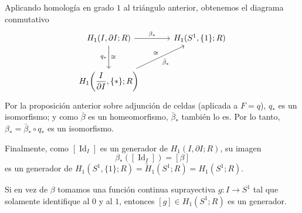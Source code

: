 \begin{ejemplo}
Aplicando homología en grado $1$ al triángulo anterior, obtenemos el diagrama conmutativo
\[
\begin{tikzcd}[column sep=3.4em, row sep=2.8em]
H_1(I, \partial I; R)
    \arrow[r, "\beta_*"]
    \arrow[d, "q_*"', "\cong"]
& H_1(S^1, \{1\}; R) \\
H_1\!\left(\dfrac{I}{\partial I}, \{*\}; R\right)
    \arrow[ur, "\bar{\beta}_*"', "\cong"]
&
\end{tikzcd}
\]
Por la proposición anterior sobre adjunción de celdas (aplicada a $F = q$), $q_*$ es un isomorfismo; y como $\bar{\beta}$ es un homeomorfismo, $\bar{\beta}_*$ también lo es. Por lo tanto, $\beta_* = \bar{\beta}_* \circ q_*$ es un isomorfismo.

Finalmente, como $[\operatorname{Id}_I]$ es un generador de $H_1(I, \partial I; R)$, su imagen
\[
\beta_*([\operatorname{Id}_I]) = [\beta]
\]
es un generador de $H_1(S^1, \{1\}; R) = \widetilde{H}_1(S^1; R) = H_1(S^1; R)$.
\end{ejemplo}
\begin{nota}
Si en vez de $\beta$ tomamos una función continua suprayectiva $g \colon I \to S^1$ tal que solamente identifique al $0$ y al $1$, entonces $[g] \in H_1(S^1; R)$ es un generador.
\end{nota}

